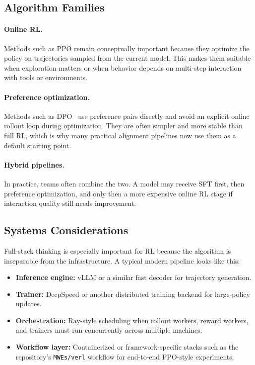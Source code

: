 \documentclass[class=article,crop=false]{standalone}
\begin{document}
\subsection{Algorithm Families}
\label{sec:rl:algorithms}

\paragraph{Online RL.}
Methods such as PPO remain conceptually important because they optimize the policy on trajectories sampled from the current model. This makes them suitable when exploration matters or when behavior depends on multi-step interaction with tools or environments.

\paragraph{Preference optimization.}
Methods such as DPO~\cite{dpo} use preference pairs directly and avoid an explicit online rollout loop during optimization. They are often simpler and more stable than full RL, which is why many practical alignment pipelines now use them as a default starting point.

\paragraph{Hybrid pipelines.}
In practice, teams often combine the two. A model may receive SFT first, then preference optimization, and only then a more expensive online RL stage if interaction quality still needs improvement.

\subsection{Systems Considerations}
\label{sec:rl:systems}

Full-stack thinking is especially important for RL because the algorithm is inseparable from the infrastructure. A typical modern pipeline looks like this:
\begin{itemize}
  \item \textbf{Inference engine:} vLLM or a similar fast decoder for trajectory generation.
  \item \textbf{Trainer:} DeepSpeed or another distributed training backend for large-policy updates.
  \item \textbf{Orchestration:} Ray-style scheduling when rollout workers, reward workers, and trainers must run concurrently across multiple machines.
  \item \textbf{Workflow layer:} Containerized or framework-specific stacks such as the repository's \texttt{MWEs/verl} workflow for end-to-end PPO-style experiments.
\end{itemize}
\end{document}
